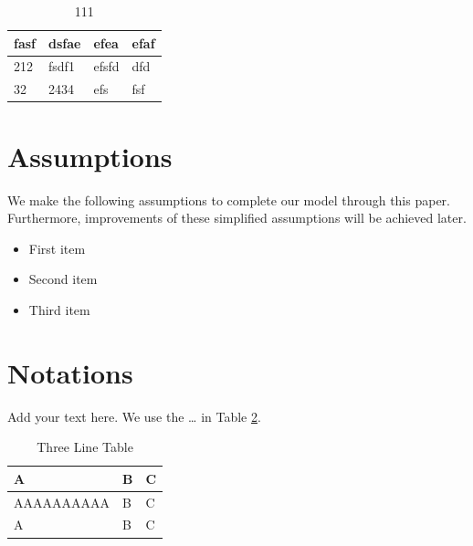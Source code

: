 \documentclass[12pt]{article}
\begin{document}
\begin{table}[!htbp] 
		\centering%
	\caption{111}\label{T1}%

\begin{tabular}{llll}
	\toprule %
	fasf & dsfae & efea  & efaf \\
	\hline %
	212  & fsdf1 & efsfd & dfd  \\
	32   & 2434  & efs   & fsf  \\
	\bottomrule %
\end{tabular}
\end{table}

\section{Assumptions}
We make the following assumptions to complete our model through this paper. Furthermore, improvements of these simplified assumptions will be achieved later.
\begin{itemize}
    \item First item
    \item Second item
    \item Third item
\end{itemize}


\section{Notations}

Add your text here. We use the … in Table \ref{T2}. 

\begin{table}[!htbp] 
\centering

\caption{Three Line Table}\label{T2}
\begin{tabular}{lll} %

\toprule %
A  &  B  &  C\\
\hline %
AAAAAAAAAA  &  B  &  C\\

A  &  B  &  C\\
\bottomrule %
\end{tabular}
\end{table}
\end{document}
